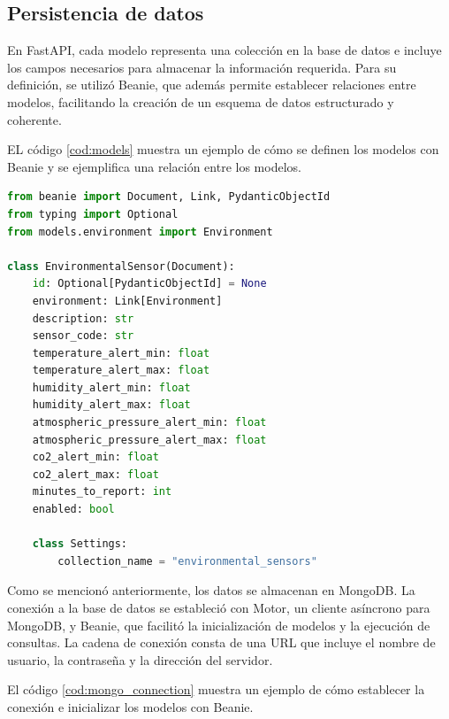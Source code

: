 \subsection{Persistencia de datos}
En FastAPI, cada modelo representa una colección en la base de datos e incluye
los campos necesarios para almacenar la información requerida. Para su
definición, se utilizó Beanie, que además permite establecer relaciones entre
modelos, facilitando la creación de un esquema de datos estructurado y
coherente.

EL código \ref{cod:models} muestra un ejemplo de cómo se definen los modelos
con Beanie y se ejemplifica una relación entre los modelos.

\begin{lstlisting}[label=cod:models,caption=Ejemplo de definición de modelos con Beanie, language=Python]
from beanie import Document, Link, PydanticObjectId
from typing import Optional
from models.environment import Environment

class EnvironmentalSensor(Document):
    id: Optional[PydanticObjectId] = None 
    environment: Link[Environment]
    description: str
    sensor_code: str
    temperature_alert_min: float
    temperature_alert_max: float
    humidity_alert_min: float
    humidity_alert_max: float
    atmospheric_pressure_alert_min: float
    atmospheric_pressure_alert_max: float
    co2_alert_min: float
    co2_alert_max: float
    minutes_to_report: int
    enabled: bool
    
    class Settings:
        collection_name = "environmental_sensors"
\end{lstlisting}

Como se mencionó anteriormente, los datos se almacenan en MongoDB. La conexión
a la base de datos se estableció con Motor, un cliente asíncrono para MongoDB,
y Beanie, que facilitó la inicialización de modelos y la ejecución de
consultas. La cadena de conexión consta de una URL que incluye el nombre de
usuario, la contraseña y la dirección del servidor.

El código \ref{cod:mongo_connection} muestra un ejemplo de cómo establecer la
conexión e inicializar los modelos con Beanie.

